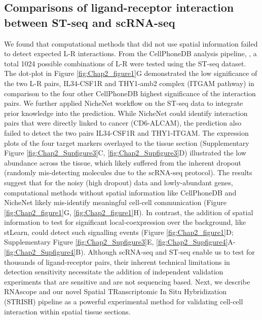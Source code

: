 \subsection{Comparisons of ligand-receptor interaction between ST-seq and scRNA-seq}
We found that computational methods that did not use spatial information failed to detect expected L-R interactions. From the CellPhoneDB analysis pipeline, \cite{efremova2020cellphonedb}, a total 1024 possible combinations of L-R were tested using the ST-seq dataset. The dot-plot in Figure \ref{fig:Chap2_figure1}G demonstrated the low significance of the two L-R pairs, IL34-CSF1R and THY1-amb2 complex (ITGAM pathway) in comparison to the four other CellPhoneDB highest significance of the interaction pairs. We further applied NicheNet \cite{browaeys2020nichenet} workflow on the ST-seq data to integrate prior knowledge into the prediction. While NicheNet could identify interaction pairs that were directly linked to cancer (\ie CD6-ALCAM), the prediction also failed to detect the two pairs IL34-CSF1R and THY1-ITGAM. The expression plots of the four target markers overlayed to the tissue section (Supplementary Figure \ref{fig:Chap2_Supfigure3}C, \ref{fig:Chap2_Supfigure3}D) illustrated the low abundance across the tissue, which likely suffered from the inherent dropout (randomly mis-detecting molecules due to the scRNA-seq protocol). The results suggest that for the noisy (high dropout) data and lowly-abundant genes, computational methods without spatial information like CellPhoneDB and NicheNet likely mis-identify meaningful cell-cell communication (Figure \ref{fig:Chap2_figure1}G, \ref{fig:Chap2_figure1}H). In contrast, the addition of spatial information to test for significant local-coexpression over the background, like stLearn, could detect such signalling events (Figure \ref{fig:Chap2_figure1}D; Supplementary Figure \ref{fig:Chap2_Supfigure3}E,  \ref{fig:Chap2_Supfigure4}A-\ref{fig:Chap2_Supfigure4}B). Although scRNA-seq and ST-seq enable us to test for thousands of ligand-receptor pairs, their inherent technical limitations in detection sensitivity necessitate the addition of independent validation experiments that are sensitive and are not sequencing based. Next, we describe RNAscope and our novel Spatial TRanscriptomic In Situ Hybridization (STRISH) pipeline as a powerful experimental method for validating cell-cell interaction within spatial tissue sections. 

